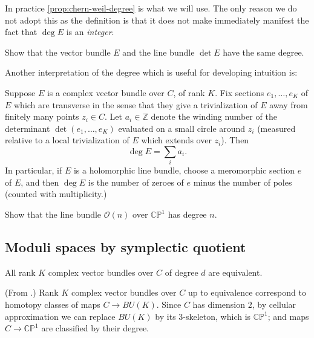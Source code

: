 \documentclass[12pt,letterpaper,reqno]{article}
\numberwithin{equation}{section}
\newcommand{\cO}{\ensuremath{\mathcal O}}
\newcommand{\C}{\ensuremath{\mathbb C}}
\newcommand{\PP}{\ensuremath{\mathbb P}}
\newcommand{\Z}{\ensuremath{\mathbb Z}}
\newcommand{\ti}[1]{\textit{#1}}
\begin{document}
In practice \autoref{prop:chern-weil-degree} is what we will use.
The only reason we do not adopt this as the definition is that
it does not make immediately manifest the fact that $\deg E$ is an 
\ti{integer}.

\begin{exercise} Show that the vector bundle $E$ and the line bundle $\det E$ 
have the same degree.
\end{exercise}

Another interpretation of the degree which is useful for developing 
intuition is:
\begin{prop} Suppose $E$ is a complex vector bundle over $C$, of rank $K$.
Fix sections $e_1, \dots, e_K$ of $E$ which are transverse in the sense
that they give a trivialization of $E$ away from finitely many points
$z_i \in C$. Let $a_i \in \Z$ denote the winding
number of the determinant $\det(e_1, \dots, e_K)$ evaluated 
on a small circle around $z_i$ (measured relative to a local trivialization
of $E$ which extends over $z_i$). Then
\begin{equation}
  \deg E = \sum_i a_i.
\end{equation}
In particular, if $E$ is a holomorphic line bundle, choose a meromorphic
section $e$ of $E$, and then $\deg E$ is the number of zeroes of $e$
minus the number of poles (counted with multiplicity.)
\end{prop}

\begin{exercise} Show that the line bundle $\cO(n)$ over $\C\PP^1$
has degree $n$.
\end{exercise}


\subsection{Moduli spaces by symplectic quotient}

\begin{prop}
All rank $K$ complex vector bundles over $C$ of degree $d$ are equivalent.
\end{prop}

\begin{pf} (From \cite{MR98b:14010}.) Rank $K$
complex vector bundles over $C$ up to equivalence correspond
to homotopy classes of maps $C \to BU(K)$. Since $C$ has dimension $2$,
by cellular approximation
we can replace $BU(K)$ by its 3-skeleton, which is $\C\PP^1$;
and maps $C \to \C\PP^1$ are classified by their degree.
\end{pf}
\end{document}
